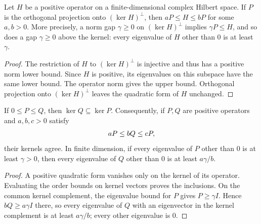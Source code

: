 \begin{lemma}
    \label{lem:positive-kernel-projection-comparison}
    \leanok
    Let $H$ be a positive operator on a finite-dimensional complex Hilbert
    space. If $P$ is the orthogonal projection onto $(\ker H)^\perp$,
    then $aP\leq H\leq bP$ for some $a,b>0$. More precisely, a norm gap
    $\gamma\geq0$ on $(\ker H)^\perp$ implies $\gamma P\leq H$, and so
    does a gap $\gamma\geq0$ above the kernel: every eigenvalue of $H$
    other than $0$ is at least $\gamma$.
\end{lemma}
\begin{proof}\leanok
    The restriction of $H$ to $(\ker H)^\perp$ is injective and thus has
    a positive norm lower bound. Since $H$ is positive, its eigenvalues
    on this subspace have the same lower bound. The operator norm gives
    the upper bound. Orthogonal projection onto $(\ker H)^\perp$
    leaves the quadratic form of $H$ unchanged.
\end{proof}

\begin{lemma}
    \label{lem:positive-comparison-kernel-gap}
    \leanok
    If $0\leq P\leq Q$, then $\ker Q\subseteq\ker P$.
    Consequently, if $P,Q$ are positive operators and $a,b,c>0$ satisfy
    \begin{align}
        aP\leq bQ\leq cP,
        \notag
    \end{align}
    their kernels agree. In finite dimension, if every eigenvalue of $P$
    other than $0$ is at least $\gamma>0$, then every eigenvalue of $Q$
    other than $0$ is at least $a\gamma/b$.
\end{lemma}
\begin{proof}\leanok
    A positive quadratic form vanishes only on the kernel of its operator.
    Evaluating the order bounds on kernel vectors proves the inclusions.
    On the common kernel complement, the eigenvalue bound for $P$ gives
    $P\geq\gamma I$. Hence $bQ\geq a\gamma I$ there, so every
    eigenvalue of $Q$ with an eigenvector in the kernel complement is at
    least $a\gamma/b$; every other eigenvalue is $0$.
\end{proof}


